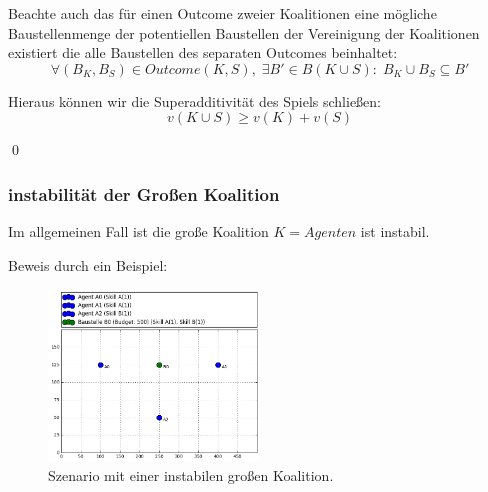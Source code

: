 %
%
Beachte auch das für einen Outcome zweier Koalitionen eine mögliche Baustellenmenge der potentiellen Baustellen der Vereinigung der Koalitionen existiert die alle Baustellen des separaten Outcomes beinhaltet:
\begin{equation}
  \forall (B_K, B_S)\in Outcome(K,S),\; \exists B'\in B(K\cup S):\; B_K\cup B_S\subseteq B'
\end{equation}

\noindent
Hieraus können wir die Superadditivität des Spiels schließen:
\begin{equation}
  v(K\cup S) \geq v(K) + v(S)
\end{equation}
\begin{flushright}
  \qed
\end{flushright}

\subsubsection{instabilität der Großen Koalition}
\label{instabil}

\begin{lemma}
  Im allgemeinen Fall ist die große Koalition $K=Agenten$ ist instabil.
\end{lemma}

Beweis durch ein Beispiel:
\begin{figure}
  \includegraphics[width=0.5\textwidth]{example-exchangeable-agents.png}
  \caption{Szenario mit einer instabilen großen Koalition.}
  \label{szenario1}
\end{figure}

